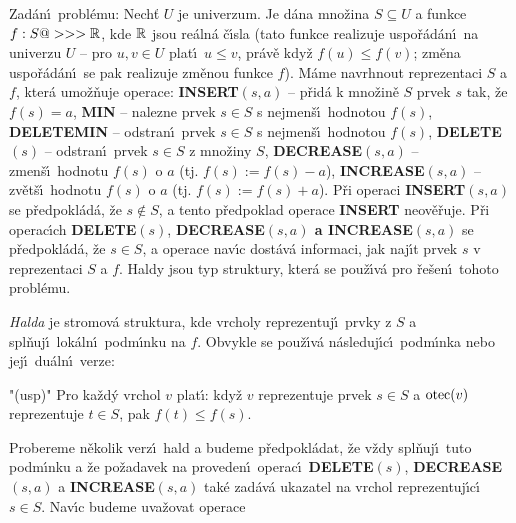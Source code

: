 \flushpar Zad\'an\'\i\ probl\'emu: Nech\v t $U$ je univerzum. Je d\'ana mno\v zina 
$S\subseteq U$ a funkce $f:S@>>>\Bbb R$, kde $\Bbb R$ jsou re\'aln\'a \v c\'\i sla (tato 
funkce realizuje uspo\v r\'ad\'an\'\i\ na univerzu $U$ -- pro $u,
v\in U$ plat\'\i\ 
$u\le v$, pr\'av\v e kdy\v z $f(u)\le f(v)$; zm\v ena uspo\v r\'ad\'an\'\i\ se pak realizuje 
zm\v enou funkce $f$).
M\'ame navrhnout reprezentaci $S$ a $f$, kter\'a umo\v z\v nuje 
operace:\newline 
{\bf INSERT$(s,a)$} -- p\v rid\'a k mno\v zin\v e $S$ prvek $s$ tak, \v ze 
$f(s)=a$,\newline 
{\bf MIN} -- nalezne prvek $s\in S$ s nejmen\v s\'\i\ hodnotou 
$f(s)$,\newline 
{\bf DELETEMIN} -- odstran\'\i\ prvek $s\in S$ s nejmen\v s\'\i\ hodnotou 
$f(s)$,\newline 
{\bf DELETE$(s)$} -- odstran\'\i\ prvek $s\in S$ z mno\v ziny $S$,\newline 
{\bf DECREASE$(s,a)$} -- zmen\v s\'\i\ hodnotu $f(s)$ o $a$ (tj. 
$f(s):=f(s)-a$),\newline 
{\bf INCREASE$(s,a)$} -- zv\v et\v s\'\i\ hodnotu $f(s)$ o $a$ (tj. 
$f(s):=f(s)+a$).\newline 
P\v ri operaci {\bf INSERT$(s,a)$} se p\v redpokl\'ad\'a, \v ze $
s\notin S$, a tento 
p\v redpoklad operace {\bf INSERT} neov\v e\v ruje. P\v ri operac\'\i ch {\bf DE\-LE\-TE$
(s)$},
{\bf DECREASE$(s,a)$ a INCREASE$(s,a)$} se p\v red\-pokl\'ad\'a, \v ze $
s\in S$, 
a operace nav\'\i c dost\'av\'a informaci, jak naj\'\i t  
prvek $s$ v reprezentaci $S$ a $f$. Haldy jsou typ 
struktury, kter\'a se pou\v z\'\i v\'a pro \v re\v sen\'\i\ tohoto probl\'emu. 
\medskip

\flushpar\emph{Halda} je stromov\'a struktura, kde vrcholy 
reprezentuj\'\i\ prvky z $S$ a spl\v nuj\'\i\ lok\'aln\'\i\ podm\'\i nku na 
$f$. Obvykle se pou\v z\'\i v\'a n\'asleduj\'\i c\'\i\ podm\'\i nka nebo jej\'\i\ 
du\'aln\'\i\ verze:
\bigskip
\roster
\item"{(usp)}"
Pro ka\v zd\'y vrchol $v$ plat\'\i : kdy\v z $v$ reprezentuje prvek 
$s\in S$ a $\operatorname{otec}(v)$ reprezentuje $t\in S$, pak $f(t)\le f(s)$.
\endroster
\medskip

\flushpar Probereme n\v ekolik verz\'\i\ hald a budeme 
p\v redpokl\'adat, \v ze v\v zdy spl\v nuj\'\i\ tuto podm\'\i nku a \v ze po\v zadavek na 
proveden\'\i\ operac\'\i\ {\bf DELETE$(s)$}, {\bf DECREA\-SE$(s,a
)$} a {\bf INCREASE$(s,a)$ }
tak\'e zad\'av\'a ukazatel na vrchol repre\-zentuj\'\i c\'\i\ $s\in 
S$.  Nav\'\i c budeme 
uva\v zovat operace
\medskip

